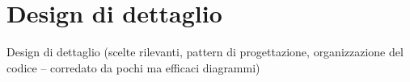 \section{Design di dettaglio}
Design di dettaglio (scelte rilevanti, pattern di progettazione, organizzazione del codice -- corredato da pochi ma efficaci diagrammi)